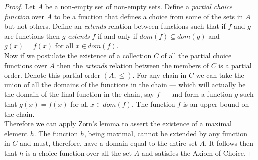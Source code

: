 \documentclass[MathsNotesBase.tex]{subfiles}
\begin{document}
{		
		\begin{tcolorbox}[breakable,enhanced jigsaw,colframe=white,colback=white,boxrule=0pt,arc=0pt,left=0pt,right=0pt,top=0pt,bottom=0pt]
		\begin{proof}
			Let $A$ be a non-empty set of non-empty sets. Define a \textit{partial choice function} over $A$ to be a function that defines a choice from some of the sets in $A$ but not others. Define an \textit{extends} relation between functions such that if $f$ and $g$ are functions then $g$ \textit{extends} $f$ if and only if ${ dom(f) \subseteq dom(g) }$ and ${ g(x) = f(x) }$ for all ${ x \in dom(f). }$\\
			Now if we postulate the existence of a collection $C$ of all the partial choice functions over $A$ then the \textit{extends} relation between the members of $C$ is a partial order. Denote this partial order ${ (A, \leq) }$.
			For any chain in $C$ we can take the union of all the domains of the functions in the chain --- which will actually be the domain of the final function in the chain, say $f$ --- and form a function $g$ such that ${ g(x) = f(x) }$ for all ${ x \in dom(f) }$. The function $f$ is an upper bound on the chain.\\
			Therefore we can apply Zorn's lemma to assert the existence of a maximal element $h$. The function $h$, being maximal, cannot be extended by any function in $C$ and must, therefore, have a domain equal to the entire set $A$. It follows then that $h$ is a choice function over all the set $A$ and satisfies the Axiom of Choice.
		\end{proof}
		\end{tcolorbox}

}
\end{document}
